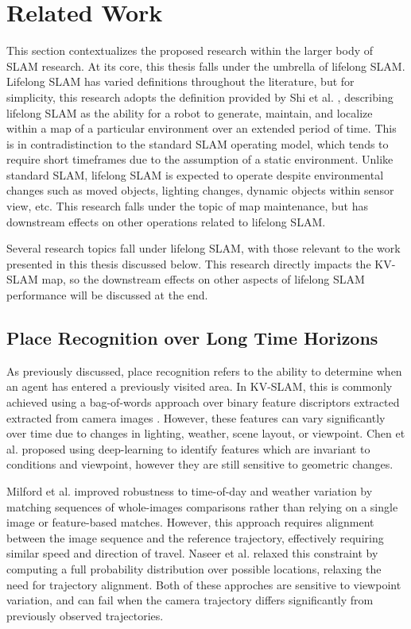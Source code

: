 \section{Related Work}
\label{sec:related_work}

This section contextualizes the proposed research within the larger body of SLAM research. At its core, this thesis falls under the umbrella of lifelong SLAM. Lifelong SLAM has varied definitions throughout the literature, but for simplicity, this research adopts the definition provided by Shi et al. \cite{shiAreWeReady2020}, describing lifelong SLAM as the ability for a robot to generate, maintain, and localize within a map of a particular environment over an extended period of time. This is in contradistinction to the standard SLAM operating model, which tends to require short timeframes due to the assumption of a static environment. Unlike standard SLAM, lifelong SLAM is expected to operate despite environmental changes such as moved objects, lighting changes, dynamic objects within sensor view, etc. This research falls under the topic of map maintenance, but has downstream effects on other operations related to lifelong SLAM.

Several research topics fall under lifelong SLAM, with those relevant to the work presented in this thesis discussed below. This research directly impacts the KV-SLAM map, so the downstream effects on other aspects of lifelong SLAM performance will be discussed at the end.

\subsection{Place Recognition over Long Time Horizons}

As previously discussed, place recognition refers to the ability to determine when an agent has entered a previously visited area. In KV-SLAM, this is commonly achieved using a bag-of-words approach over binary feature discriptors extracted extracted from camera images \cite{camposORBSLAM3AccurateOpenSource2021}. However, these features can vary significantly over time due to changes in lighting, weather, scene layout, or viewpoint. Chen et al. \cite{chenDeepLearningFeatures2017} proposed using deep-learning to identify features which are invariant to conditions and viewpoint, however they are still sensitive to geometric changes.

Milford et al. improved robustness to time-of-day and weather variation by matching sequences of whole-images comparisons rather than relying on a single image or feature-based matches. However, this approach requires alignment between the image sequence and the reference trajectory, effectively requiring similar speed and direction of travel. Naseer et al. \cite{naseerVisionbasedMarkovLocalization2015} relaxed this constraint by computing a full probability distribution over possible locations, relaxing the need for trajectory alignment. Both of these approches are sensitive to viewpoint variation, and can fail when the camera trajectory differs significantly from previously observed trajectories.

